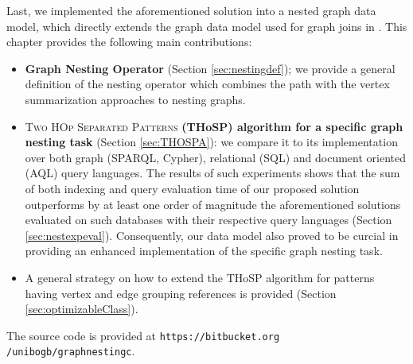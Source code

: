 

Last, we implemented the aforementioned solution into a nested graph data model, which directly extends the graph data model used for graph joins in  \cite{bergamimm17}. 
This chapter provides the following main contributions:

\begin{itemize}
	\item \textbf{Graph Nesting Operator} (Section \ref{sec:nestingdef}); we provide a general definition of the nesting operator which combines the path  with the vertex summarization approaches to nesting graphs.
	\item \textsc{{Two HOp Separated Patterns}} \textbf{(THoSP) algorithm for a specific graph nesting task} (Section \ref{sec:THOSPA}): we
	compare it to its implementation
	over both graph  (SPARQL, Cypher), relational (SQL) and document oriented (AQL) query languages. The results of such experiments shows that the sum of both indexing and query evaluation time of our proposed solution outperforms by at least one order of magnitude the aforementioned solutions evaluated on such databases with their respective query languages (Section \ref{sec:nestexpeval}). Consequently, our data model also proved to be curcial in providing an enhanced implementation of the specific graph nesting task.
	\item A general strategy on how to extend the THoSP algorithm for patterns having vertex and edge grouping references is provided (Section \ref{sec:optimizableClass}).
\end{itemize}

The source code is provided at \texttt{https://bitbucket.org\\/unibogb/graphnestingc}.
